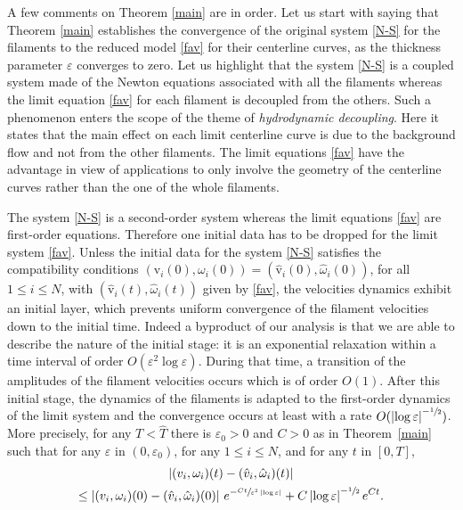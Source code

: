 \documentclass[11pt]{article}
\let\eps\varepsilon
\theoremstyle{definition}
\theoremstyle{remark}
\begin{document}
A few comments on Theorem \ref{main} are in order. Let us start with saying that Theorem \ref{main} establishes the convergence of the original system \eqref{N-S} for the filaments to the reduced model \eqref{fav} for their centerline curves, as the thickness parameter $\eps$ converges to zero. Let us highlight that the system \eqref{N-S} is a coupled system made of the Newton equations associated with all the filaments whereas the limit equation \eqref{fav} for each filament is decoupled from the others. Such a phenomenon enters the scope
of the theme of \textit{hydrodynamic decoupling}. Here it states that the main effect on each limit centerline curve is due to the background flow and not from the other filaments. The limit equations \eqref{fav} have the advantage in view of applications to only involve the geometry of the centerline curves rather than the one of the whole filaments.

The system \eqref{N-S} is a second-order system whereas the limit equations \eqref{fav} are {first-order equations}. Therefore one initial data has to be dropped for the limit system \eqref{fav}. Unless
the initial data for the system \eqref{N-S} satisfies the compatibility conditions $(\textrm{v}_i (0),\omega_i (0)) = (\hat{\textrm{v}}_i(0),{\hat \omega}_i (0))$, for all $1 \leq i \leq N$, with $(\hat{\textrm{v}}_i(t),{\hat \omega}_i (t))$ given by \eqref{fav},
the velocities dynamics exhibit {an} initial layer, which prevents
uniform convergence of the filament velocities down to the initial time.
Indeed a byproduct of our analysis is that
we are able to describe the nature of the initial stage: it is an exponential relaxation within a time interval of order
$O(\eps^2 \log \eps)${. During that} time,
a transition of the amplitudes of the filament velocities occurs which is of order $O(1)$. After this initial stage, the dynamics of the filaments is adapted to the first-order dynamics of the limit system and the convergence occurs at least with a rate $O(\left|\log \eps \right|^{-\sfrac12})$.
More precisely, {for any $T < \hat T$ there is $\eps_0 > 0$ and $C>0$ as in Theorem~\ref{main}} such that for any $\eps $ in $(0,\eps_0)$, for any $1 \leq i \leq N$, and for any $t$ in $[0,T]$,%
\begin{multline}
\left| ({\textrm{v}}_i,\omega_{i})(t) - ({\hat {\textrm{v}}}_i, \hat \omega_i) (t) \right|\\
\leq \left| (\textrm{v}_i,\omega_i) (0)-
(\hat{\textrm{v}}_i,{\hat \omega}_i) (0) \right| \, e^{- \sfrac{C t}{\eps^2 \left|\log \eps\right|}} + C \left|\log \eps\right|^{-\sfrac12} e^{Ct}. \label{allezesti}
\end{multline}
\end{document}
